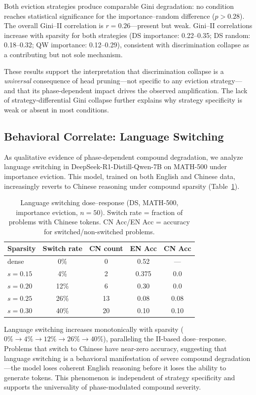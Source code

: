 \documentclass[11pt,a4paper]{article}
\begin{document}
Both eviction strategies produce comparable Gini degradation: no condition reaches statistical significance for the importance--random difference ($p > 0.28$). The overall Gini--II correlation is $r = 0.26$---present but weak. Gini--II correlations increase with sparsity for both strategies (DS importance: 0.22--0.35; DS random: 0.18--0.32; QW importance: 0.12--0.29), consistent with discrimination collapse as a contributing but not sole mechanism.

These results support the interpretation that discrimination collapse is a \emph{universal} consequence of head pruning---not specific to any eviction strategy---and that its phase-dependent impact drives the observed amplification. The lack of strategy-differential Gini collapse further explains why strategy specificity is weak or absent in most conditions.

\subsection{Behavioral Correlate: Language Switching}
\label{sec:lang}

As qualitative evidence of phase-dependent compound degradation, we analyze language switching in DeepSeek-R1-Distill-Qwen-7B on MATH-500 under importance eviction. This model, trained on both English and Chinese data, increasingly reverts to Chinese reasoning under compound sparsity (Table~\ref{tab:lang}).

\begin{table}[t]
\centering
\small
\caption{Language switching dose--response (DS, MATH-500, importance eviction, $n=50$). Switch rate = fraction of problems with Chinese tokens. CN Acc/EN Acc = accuracy for switched/non-switched problems.}
\label{tab:lang}
\begin{tabular}{lcccc}
\toprule
Sparsity & Switch rate & CN count & EN Acc & CN Acc \\
\midrule
dense & 0\% & 0 & 0.52 & --- \\
$s{=}0.15$ & 4\% & 2 & 0.375 & 0.0 \\
$s{=}0.20$ & 12\% & 6 & 0.30 & 0.0 \\
$s{=}0.25$ & 26\% & 13 & 0.08 & 0.08 \\
$s{=}0.30$ & 40\% & 20 & 0.10 & 0.10 \\
\bottomrule
\end{tabular}
\end{table}

Language switching increases monotonically with sparsity ($0\% \to 4\% \to 12\% \to 26\% \to 40\%$), paralleling the II-based dose--response. Problems that switch to Chinese have near-zero accuracy, suggesting that language switching is a behavioral manifestation of severe compound degradation---the model loses coherent English reasoning before it loses the ability to generate tokens. This phenomenon is independent of strategy specificity and supports the universality of phase-modulated compound severity.
\end{document}
